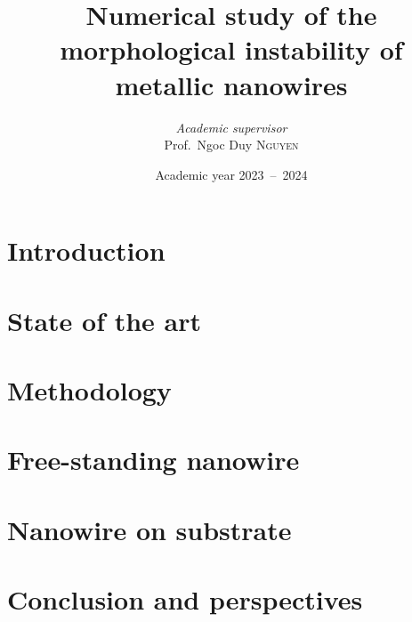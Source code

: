 \documentclass[twoside, 12pt]{report}
\institute{University of Liège}
\title{Numerical study of the morphological instability of metallic nanowires}
\author{\textit{Academic supervisor}\\Prof.\ Ngoc Duy \textsc{Nguyen}}
\date{Academic year 2023\ --\ 2024}
\begin{document}
    \maketitle
    \chapter*{Introduction}\label{chap:intro}
    
    \chapter{State of the art}\label{chap:1-sota}
    
    \chapter{Methodology}\label{chap:2-methodology}
    
    \chapter{Free-standing nanowire}\label{chap:3-results}

    
    \chapter{Nanowire on substrate}\label{chap:4-substrate}
    
    \chapter*{Conclusion and perspectives}\label{chap:concl}
    

    
    \newpage
    \appendix
    
    
    \newpage
    \nocite{*}
    \printbibliography
\end{document}
